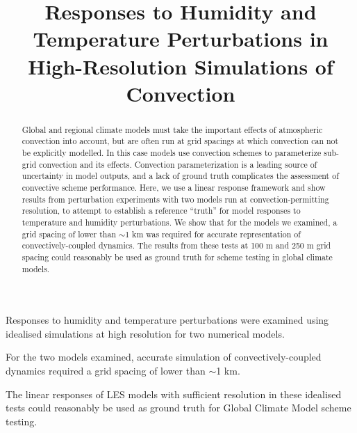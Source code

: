 \documentclass[draft]{agujournal2019}
\begin{document}
\title{Responses to Humidity and Temperature Perturbations in High-Resolution Simulations of Convection}




\begin{keypoints}
    \item Responses to humidity and temperature perturbations were examined
    using idealised simulations at high resolution for two numerical
    models.
    \item For the two models examined, accurate simulation of
    convectively-coupled dynamics required a grid spacing of lower than $\sim$1
    km.
    \item The linear responses of LES models with sufficient resolution in these
    idealised tests could reasonably be used as ground truth for Global Climate
    Model scheme testing.
\end{keypoints}

\justifying

\begin{abstract}
Global and regional climate models must take the important effects of
atmospheric convection into account, but are often run at grid spacings at which
convection can not be explicitly modelled. In this case models use convection
schemes to parameterize sub-grid convection and its effects. Convection
parameterization is a leading source of uncertainty in model outputs, and a lack
of ground truth complicates the assessment of convective scheme performance.
Here, we use a linear response framework and show results from perturbation
experiments with two models run at convection-permitting resolution, to attempt
to establish a reference ``truth'' for model responses to temperature and
humidity perturbations. We show that for the models we examined, a grid spacing
of lower than $\sim$1 km was required for accurate representation of
convectively-coupled dynamics. The results from these tests at 100 m and 250 m
grid spacing could reasonably be used as ground truth for scheme testing in
global climate models.
\end{abstract}
\end{document}
